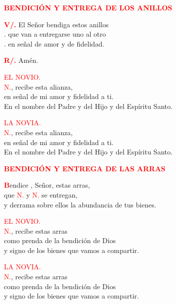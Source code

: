 \documentclass[12pt, letterpaper]{report}
\begin{document}
  \clearpage

  \Large {\bfseries \textcolor{red}{BENDICI\'ON Y ENTREGA DE LOS ANILLOS}}

  \Large \hspace{-0.9cm} {\bfseries \textcolor{red}{V/.}} \hspace{0.5cm} El Se\~nor bendiga \Huge \textcolor{red}{} \Large estos anillos \\
  . \hspace{1cm} que van a entregarse uno al otro \\
  . \hspace{1cm} en se\~nal de amor y de fidelidad.

  \Large \hspace{-0.9cm}  {\bfseries \textcolor{red}{R/.}} \hspace{0.5cm}  Am\'en.

  \textcolor{red}{EL NOVIO.}\\
  \textcolor{red}{N.}, recibe esta alianza, \\
  en se\~nal de mi amor y fidelidad a ti. \\
  En el nombre del Padre y del Hijo y del Esp\'iritu Santo.

  \textcolor{red}{LA NOVIA.}\\
  \textcolor{red}{N.}, recibe esta alianza, \\
  en se\~nal de mi amor y fidelidad a ti. \\
  En el nombre del Padre y del Hijo y del Esp\'iritu Santo.

  \Large {\bfseries \textcolor{red}{BENDICI\'ON Y ENTREGA DE LAS ARRAS}}

  \lettrine[lines=2]{\bfseries \textcolor{red}{B}}{}\Large endice \Huge \textcolor{red}{},  \Large Se\~nor, estas arras, \\
  que \textcolor{red}{N.} y \textcolor{red}{N.} se entregan, \\
  y derrama sobre ellos la abundancia de tus bienes.

  \textcolor{red}{EL NOVIO.}\\
  \textcolor{red}{N.}, recibe estas arras \\
  como prenda de la bendici\'on de Dios \\
  y signo de los bienes que vamos a compartir.
  
  \clearpage

  \textcolor{red}{LA NOVIA.}\\
  \textcolor{red}{N.}, recibe estas arras \\
  como prenda de la bendici\'on de Dios \\
  y signo de los bienes que vamos a compartir.
\end{document}
